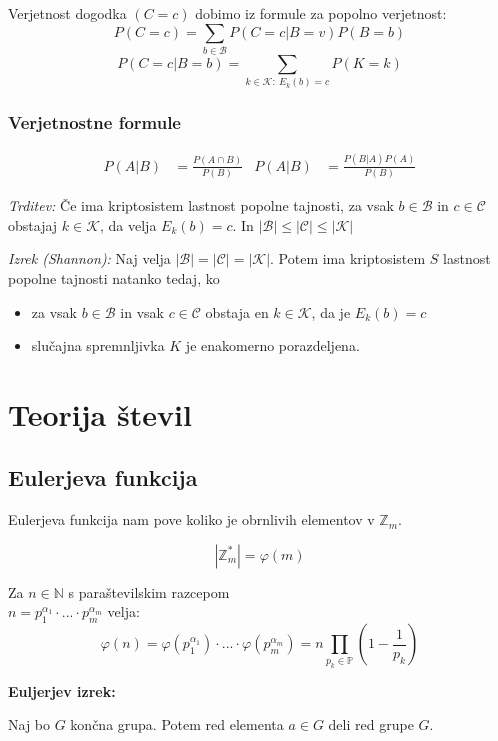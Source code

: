\begin{multicols}{5}
Verjetnost dogodka $(C = c)$ dobimo iz formule za popolno verjetnost:
\[ P(C = c) = \sum_{b \in \mathcal{B}} P(C = c | B = v) P(B = b) \]
\[ P(C = c | B = b) = \sum_{k \in \mathcal{K}:\ E_k(b) = c} P(K = k) \]

\subsubsection*{Verjetnostne formule}
\begin{align*}
	P(A|B) &= \frac{P(A \cap B)}{P(B)} & P(A|B) &= \frac{P(B|A)P(A)}{P(B)} 
\end{align*}

\textit{Trditev:} Če ima kriptosistem lastnost popolne tajnosti, za 
vsak $b \in \mathcal{B}$ in $c \in \mathcal{C}$ obstajaj $k \in \mathcal{K}$, 
da velja $E_k(b) = c$. In $|\mathcal{B}| \leq |\mathcal{C}| \leq |\mathcal{K}|$


\textit{Izrek (Shannon):} Naj velja $|\mathcal{B}| = |\mathcal{C}| = |\mathcal{K}|$.
Potem ima kriptosistem $S$ lastnost popolne tajnosti natanko tedaj, ko
\begin{itemize}
	\item za vsak $b \in \mathcal{B}$ in vsak $c \in \mathcal{C}$ obstaja en $k \in \mathcal{K}$,
	da je $E_k(b) = c$
	\item slučajna spremnljivka $K$ je enakomerno porazdeljena.
\end{itemize}

\section*{Teorija števil}

\subsection{Eulerjeva funkcija}
Eulerjeva funkcija nam pove koliko je obrnlivih elementov v $\mathbb{Z}_m$.

\[ | \mathbb{Z}_m^* | = \varphi(m) \]

Za $n \in \mathbb{N}$ s paraštevilskim razcepom \\ $ n = p_1^{\alpha_1} \cdot ... \cdot p_m^{\alpha_m}$ velja:
\[\varphi(n) = \varphi(p_1^{\alpha_1}) \cdot ... \cdot \varphi(p_m^{\alpha_m}) = n \prod_{ p_k \in \mathbb{P}} \left(1-\frac{1}{p_k} \right) \]

\textbf{Euljerjev izrek:}

Naj bo $G$ končna grupa. Potem red elementa $a \in G$ deli red grupe $G$.


\end{multicols}
